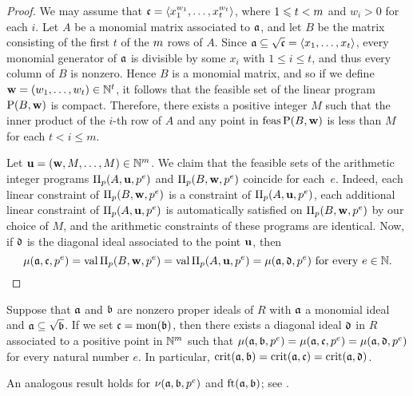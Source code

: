 \documentclass{amsart}
\begin{document}
\begin{proof}
   We may assume that $\mathfrak{c} = \langle x_1^{w_1}, \ldots, x_t^{w_t} \rangle$, where $1 \leqslant t < m$ and $w_i > 0$ for each $i$.
   Let $A$ be a monomial matrix associated to $\mathfrak{a}$, and let $B$ be the matrix consisting of the first $t$ of the $m$ rows of $A$.
   Since $\mathfrak{a} \subseteq \sqrt {\mathfrak{c}} = \langle x_1, \ldots, x_t \rangle$, every monomial generator of $\mathfrak{a}$ is divisible by some $x_i$ with $1 \leq i \leq t$, and thus every column of $B$ is nonzero.
   Hence $B$ is a monomial matrix, and so if we define $\mathbf{w} = (w_1, \ldots, w_t) \in \mathbb{N}^t$, it follows that the feasible set of the linear program $\mathrm{P}(B, \mathbf{w})$ is compact.
   Therefore, there exists a positive integer $M$ such that the inner product of the $i$-th row of $A$ and any point in $\operatorname{feas} \mathrm{P}(B, \mathbf{w})$ is less than $M$ for each $t < i \leq m$.

   Let $\mathbf{u} = (\mathbf{w},M,\ldots,M)\in \mathbb{N}^m$.
   We claim that the feasible sets of the arithmetic integer programs $\Pi_p(A,\mathbf{u},p^e)$ and $\Pi_p(B,\mathbf{w},p^e)$ coincide for each~$e$.
   Indeed, each linear constraint of $\Pi_p(B, \mathbf{w}, p^e)$ is a constraint of $\Pi_p(A, \mathbf{u},p^e)$, each additional linear constraint of $\Pi_p(A, \mathbf{u},p^e)$ is automatically satisfied on $\Pi_p(B, \mathbf{w},p^e)$ by our choice of $M$, and the arithmetic constraints of these programs are identical.
   Now, if $\mathfrak{d}$ is the diagonal ideal associated to the point $\mathbf{u}$, then
   \[
      \mu(\mathfrak{a}, \mathfrak{c}, p^e) = \operatorname{val}\Pi_p(B, \mathbf{w}, p^e)  = \operatorname{val} \Pi_p(A, \mathbf{u}, p^e) = \mu(\mathfrak{a}, \mathfrak{d}, p^e)\text{ for every $e \in \mathbb{N}$.}
      \qedhere
  \]
\end{proof}

\begin{theorem}
   \label{reduce-to-monomial-case: T}
   Suppose that $\mathfrak{a}$ and $\mathfrak{b}$ are nonzero proper ideals of $R$ with $\mathfrak{a}$ a monomial ideal and $\mathfrak{a} \subseteq \sqrt{\mathfrak{b}}$.
   If we set $\mathfrak{c} = \operatorname{mon}(\mathfrak{b})$,  then there exists a diagonal ideal $\mathfrak{d}$ in $R$ associated to a positive point in $\mathbb{N}^m$ such that $\mu(\mathfrak{a}, \mathfrak{b}, p^e) = \mu(\mathfrak{a}, \mathfrak{c}, p^e) = \mu(\mathfrak{a}, \mathfrak{d}, p^e)$ for every natural number $e$.
   In particular, $\operatorname{crit}(\mathfrak{a},\mathfrak{b}) = \operatorname{crit}(\mathfrak{a}, \mathfrak{c}) = \operatorname{crit}(\mathfrak{a}, \mathfrak{d})$.
\end{theorem}

 
\begin{remark}
   An analogous result holds for $\nu(\mathfrak{a},\mathfrak{b},p^e)$ and $\operatorname{ft}(\mathfrak{a}, \mathfrak{b})$; see \cite[Section~4]{budur+mustata+saito.roots_bs_polys_monomial}.
\end{remark}
\end{document}
